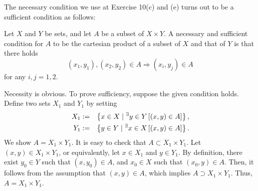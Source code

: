 \documentclass[a4paper,12pt]{article}
\begin{document}
The necessary condition we use at Exercise 10(c) and (e) turns out to be a sufficient condition as follows:
\begin{prp}\label{prop:cartesian}
	Let
	\( X \)
	and
	\( Y \)
	be sets, and let
	\( A \)
	be a subset of
	\( X \times Y \).
	A necessary and sufficient condition for \( A \) to be the cartesian product of a subset of \( X \) and that of \( Y \) is that there holds
	\begin{equation*}
		(x_1,y_1),(x_2,y_2) \in A \Rightarrow (x_i,y_j) \in A
	\end{equation*}
	for any \( i,j=1,2 \).
\end{prp}
\begin{prf}
	Necessity is obvious.
	To prove sufficiency, suppose the given condition holds.
	Define two sets \( X_1 \) and \( Y_1 \) by setting
	\begin{eqnarray*}
		X_1&:=&\left\{  x \in X \;|\; {}^{\exists} y \in Y\left[ (x,y)\in A \right] \right\},\\
		Y_1&:=&\left\{  y \in Y \;|\; {}^{\exists} x \in X\left[ (x,y)\in A \right] \right\}.
	\end{eqnarray*}
	We show
	\( A=X_1\times Y_1 \).
	It is easy to check that
	\( A \subset X_1\times Y_1 \).
	Let
	\((x,y)\in X_1\times Y_1 \),
	or equivalently, let
	\( x\in X_1 \)
	and
	\( y \in Y_1 \).
	By definition, there exist \( y_0 \in Y \) such that \( (x,y_0) \in A \),
	and \( x_0 \in X \) such that \( (x_0,y) \in A \).
	Then, it follows from the assumption that \( (x,y) \in A \),
	which implies \( A \supset X_1\times Y_1 \).
	Thus, \( A=X_1\times Y_1 \).
\end{prf}
\end{document}
